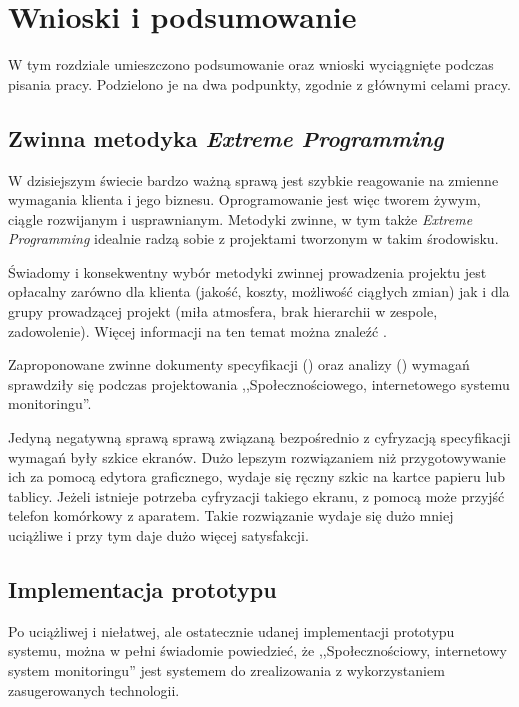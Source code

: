\chapter{Wnioski i podsumowanie}
\label{cha:WnioskiIpodsumowanie}

W tym rozdziale umieszczono podsumowanie oraz wnioski wyciągnięte podczas pisania pracy. Podzielono je na dwa podpunkty, zgodnie z głównymi celami pracy.

\section{Zwinna metodyka \textit{Extreme Programming}}
\label{sec:WnioskiZwinnaMetodyka}

W dzisiejszym świecie bardzo ważną sprawą jest szybkie reagowanie na zmienne wymagania klienta i jego biznesu. Oprogramowanie jest więc tworem żywym, ciągle rozwijanym i usprawnianym. Metodyki zwinne, w tym także \textit{Extreme Programming} idealnie radzą sobie z projektami tworzonym w takim środowisku.

Świadomy i konsekwentny wybór metodyki zwinnej prowadzenia projektu jest opłacalny zarówno dla klienta (jakość, koszty, możliwość ciągłych zmian) jak i dla grupy prowadzącej projekt (miła atmosfera, brak hierarchii w zespole, zadowolenie). Więcej informacji na ten temat można znaleźć .

Zaproponowane zwinne dokumenty specyfikacji () oraz analizy () wymagań sprawdziły się podczas projektowania ,,Społecznościowego, internetowego systemu monitoringu''.

Jedyną negatywną sprawą sprawą związaną bezpośrednio z cyfryzacją specyfikacji wymagań były szkice ekranów. Dużo lepszym rozwiązaniem niż przygotowywanie ich za pomocą edytora graficznego, wydaje się ręczny szkic na kartce papieru lub tablicy. Jeżeli istnieje potrzeba cyfryzacji takiego ekranu, z pomocą może przyjść telefon komórkowy z aparatem. Takie rozwiązanie wydaje się dużo mniej uciążliwe i przy tym daje dużo więcej satysfakcji.

\section{Implementacja prototypu}
\label{sec:WnioskiImplementacjaPrototypu}

Po uciążliwej i niełatwej, ale ostatecznie udanej implementacji prototypu systemu, można w pełni świadomie powiedzieć, że ,,Społecznościowy, internetowy system monitoringu'' jest systemem do zrealizowania z wykorzystaniem zasugerowanych technologii.

